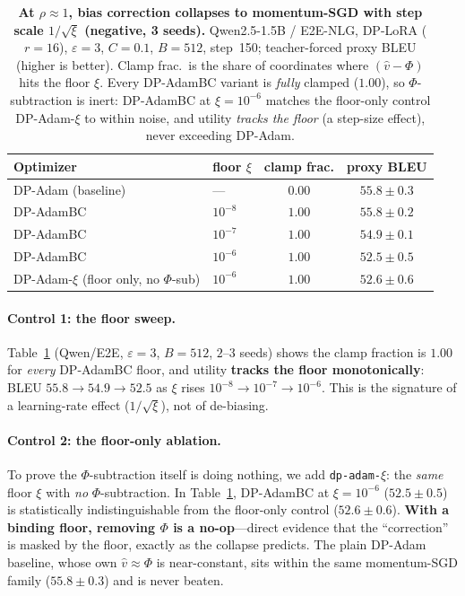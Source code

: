 \documentclass[11pt]{article}
\theoremstyle{plain}
\theoremstyle{definition}
\theoremstyle{remark}
\begin{document}
\begin{table}[t]
\centering
\caption{\textbf{At $\rho\!\approx\!1$, bias correction collapses to momentum-SGD with step
scale $1/\sqrt{\xi}$ (negative, 3 seeds).} Qwen2.5-1.5B / E2E-NLG, DP-LoRA ($r{=}16$),
$\varepsilon{=}3$, $C{=}0.1$, $B{=}512$, step~150; teacher-forced proxy BLEU (higher is
better). Clamp frac.\ is the share of coordinates where $(\hat v-\Phi)$ hits the floor $\xi$.
Every DP-AdamBC variant is \emph{fully} clamped ($1.00$), so $\Phi$-subtraction is inert:
DP-AdamBC at $\xi{=}10^{-6}$ matches the floor-only control DP-Adam-$\xi$ to within noise, and
utility \emph{tracks the floor} (a step-size effect), never exceeding DP-Adam.}
\label{tab:bc-floor}
\begin{tabular}{llcc}
\toprule
Optimizer & floor $\xi$ & clamp frac. & proxy BLEU \\
\midrule
DP-Adam (baseline)                         & ---       & $0.00$ & $55.8\pm0.3$ \\
\midrule
DP-AdamBC                                   & $10^{-8}$ & $1.00$ & $55.8\pm0.2$ \\
DP-AdamBC                                   & $10^{-7}$ & $1.00$ & $54.9\pm0.1$ \\
DP-AdamBC                                   & $10^{-6}$ & $1.00$ & $52.5\pm0.5$ \\
\midrule
DP-Adam-$\xi$ (floor only, no $\Phi$-sub)   & $10^{-6}$ & $1.00$ & $52.6\pm0.6$ \\
\bottomrule
\end{tabular}
\end{table}

\paragraph{Control 1: the floor sweep.}
Table~\ref{tab:bc-floor} (Qwen/E2E, $\varepsilon{=}3$, $B{=}512$, $2$--$3$ seeds) shows the clamp
fraction is $1.00$ for \emph{every} DP-AdamBC floor, and utility \textbf{tracks the floor
monotonically}: BLEU $55.8\to54.9\to52.5$ as $\xi$ rises $10^{-8}\to10^{-7}\to10^{-6}$. This is the
signature of a learning-rate effect ($1/\sqrt{\xi}$), not of de-biasing.

\paragraph{Control 2: the floor-only ablation.}
To prove the $\Phi$-subtraction itself is doing nothing, we add \texttt{dp-adam-$\xi$}: the
\emph{same} floor $\xi$ with \emph{no} $\Phi$-subtraction. In Table~\ref{tab:bc-floor},
DP-AdamBC at $\xi{=}10^{-6}$ ($52.5\pm0.5$) is statistically indistinguishable from the floor-only
control ($52.6\pm0.6$). \textbf{With a binding floor, removing $\Phi$ is a no-op}---direct evidence
that the ``correction'' is masked by the floor, exactly as the collapse predicts. The plain DP-Adam
baseline, whose own $\hat v\approx\Phi$ is near-constant, sits within the same momentum-SGD family
($55.8\pm0.3$) and is never beaten.
\end{document}
